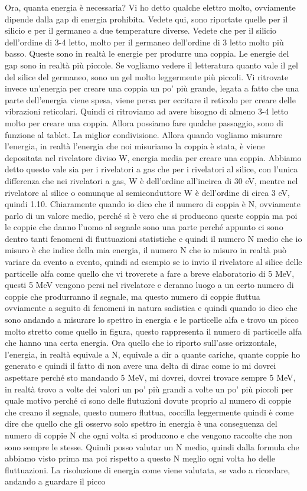 Ora, quanta energia è necessaria? Vi ho detto qualche elettro molto, ovviamente dipende dalla gap di energia prohibita. Vedete qui, sono riportate quelle per il silicio e per il germaneo a due temperature diverse. Vedete che per il silicio dell'ordine di 3-4 letto, molto per il germaneo dell'ordine di 3 letto molto più basso. Queste sono in realtà le energie per produrre una coppia. Le energie del gap sono in realtà più piccole. Se vogliamo vedere il letteratura quanto vale il gel del silice del germaneo, sono un gel molto leggermente più piccoli. Vi ritrovate invece un'energia per creare una coppia un po' più grande, legata a fatto che una parte dell'energia viene spesa, viene persa per eccitare il reticolo per creare delle vibrazioni reticolari. Quindi ci ritroviamo ad avere bisogno di almeno 3-4 letto molto per creare una coppia. Allora possiamo fare qualche passaggio, sono di funzione al tablet. La miglior condivisione. Allora quando vogliamo misurare l'energia, in realtà l'energia che noi misuriamo la coppia è stata, è viene depositata nel rivelatore diviso W, energia media per creare una coppia. Abbiamo detto questo vale sia per i rivelatori a gas che per i rivelatori al silice, con l'unica differenza che nei rivelatori a gas, W è dell'ordine all'incirca di 30 eV, mentre nel rivelatore al silice o comunque al semiconduttore W è dell'ordine di circa 3 eV, quindi 1.10. Chiaramente quando io dico che il numero di coppia è N, ovviamente parlo di un valore medio, perché sì è vero che si producono queste coppia ma poi le coppie che danno l'uomo al segnale sono una parte perché appunto ci sono dentro tanti fenomeni di fluttuazioni statistiche e quindi il numero N medio che io misuro è che indice della mia energia, il numero N che io misuro in realtà può variare da evento a evento, quindi ad esempio se io invio il rivelatore al silice delle particelle alfa come quello che vi troverete a fare a breve elaboratorio di 5 MeV, questi 5 MeV vengono persi nel rivelatore e deranno luogo a un certo numero di coppie che produrranno il segnale, ma questo numero di coppie fluttua ovviamente a seguito di fenomeni in natura sadistica e quindi quando io dico che sono andando a misurare lo spettro in energia e le particelle alfa e trovo un picco molto stretto come quello in figura, questo rappresenta il numero di particelle alfa che hanno una certa energia. Ora quello che io riporto sull'asse orizzontale, l'energia, in realtà equivale a N, equivale a dir a quante cariche, quante coppie ho generato e quindi il fatto di non avere una delta di dirac come io mi dovrei aspettare perché sto mandando 5 MeV, mi dovrei, dovrei trovare sempre 5 MeV, in realtà trovo a volte dei valori un po' più grandi a volte un po' più piccoli per quale motivo perché ci sono delle flutuzioni dovute proprio al numero di coppie che creano il segnale, questo numero fluttua, coccilla leggermente quindi è come dire che quello che gli osservo solo spettro in energia è una conseguenza del numero di coppie N che ogni volta si producono e che vengono raccolte che non sono sempre le stesse. Quindi posso valutar un N medio, quindi dalla formula che abbiamo visto prima ma poi rispetto a questo N meglio ogni volta ho delle fluttuazioni. La risoluzione di energia come viene valutata, se vado a ricordare, andando a guardare il picco 